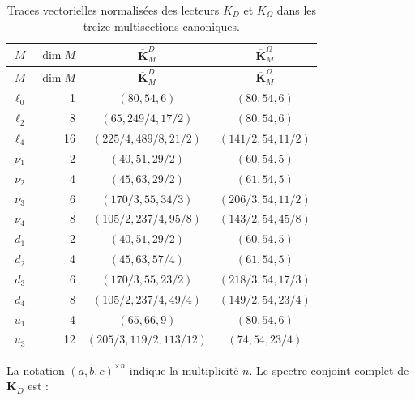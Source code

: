 \begin{longtable}{@{}c r c c@{}}
\caption{Traces vectorielles normalisées des lecteurs \(K_D\) et
\(K_\Omega\) dans les treize multisections canoniques.}
\label{tab:trazas-multisecciones-two-way-rev11}\\
\toprule
\(M\)&\(\dim M\)&\(\overline{\mathbf K}_M^D\)&\(\overline{\mathbf K}_M^\Omega\)\\
\midrule
\endfirsthead
\toprule
\(M\)&\(\dim M\)&\(\overline{\mathbf K}_M^D\)&\(\overline{\mathbf K}_M^\Omega\)\\
\midrule
\endhead
\(\ell_0\)&1&\((80,54,6)\)&\((80,54,6)\)\\
\(\ell_2\)&8&\((65,249/4,17/2)\)&\((80,54,6)\)\\
\(\ell_4\)&16&\((225/4,489/8,21/2)\)&\((141/2,54,11/2)\)\\
\(\nu_1\)&2&\((40,51,29/2)\)&\((60,54,5)\)\\
\(\nu_2\)&4&\((45,63,29/2)\)&\((61,54,5)\)\\
\(\nu_3\)&6&\((170/3,55,34/3)\)&\((206/3,54,11/2)\)\\
\(\nu_4\)&8&\((105/2,237/4,95/8)\)&\((143/2,54,45/8)\)\\
\(d_1\)&2&\((40,51,29/2)\)&\((60,54,5)\)\\
\(d_2\)&4&\((45,63,57/4)\)&\((61,54,5)\)\\
\(d_3\)&6&\((170/3,55,23/2)\)&\((218/3,54,17/3)\)\\
\(d_4\)&8&\((105/2,237/4,49/4)\)&\((149/2,54,23/4)\)\\
\(u_1\)&4&\((65,66,9)\)&\((80,54,6)\)\\
\(u_3\)&12&\((205/3,119/2,113/12)\)&\((74,54,23/4)\)\\
\bottomrule
\end{longtable}

La notation \((a,b,c)^{\times n}\) indique la multiplicité \(n\). Le spectre
conjoint complet de \(\mathbf K_D\) est :


